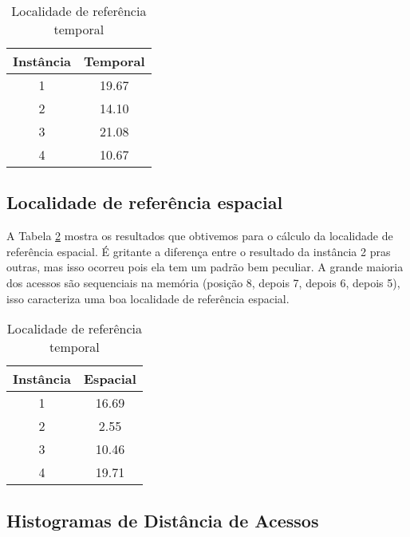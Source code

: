\documentclass[12pt]{article}
\begin{document}
\begin{table}[h!]
\centering
\begin{footnotesize}
\begin{tabular}{|c|c|}
\hline
\textbf{Instância}  & \textbf{Temporal}  \\ \hline
1 & 19.67 \\ \hline
2 & 14.10 \\ \hline
3 & 21.08 \\ \hline
4 & 10.67 \\ \hline

\end{tabular}
\end{footnotesize}
\caption{Localidade de referência temporal \label{tab_ref_temp}}
\end{table}


\subsection{Localidade de referência espacial}
\label{loc_ref_esp}

A Tabela \ref{tab_ref_esp} mostra os resultados que obtivemos para o cálculo da localidade de referência espacial. É gritante a diferença entre o resultado da instância 2 pras outras, mas isso ocorreu pois ela tem um padrão bem peculiar. A grande maioria dos acessos são sequenciais na memória (posição 8, depois 7, depois 6, depois 5), isso caracteriza uma boa localidade de referência espacial.


\begin{table}[h!]
\centering
\begin{footnotesize}
\begin{tabular}{|c|c|}
\hline
\textbf{Instância}  & \textbf{Espacial}  \\ \hline
1 &  16.69\\ \hline
2 & 2.55\\ \hline
3 &  10.46\\ \hline
4 &  19.71\\ \hline

\end{tabular}
\end{footnotesize}
\caption{Localidade de referência temporal \label{tab_ref_esp}}
\end{table}


\subsection{Histogramas de Distância de Acessos}
\label{hist_dist_acess}
\end{document}
